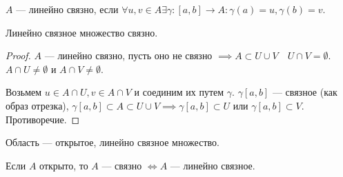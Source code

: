 \begin{definition}
    $A$ --- линейно связно, если  $\forall u, v \in A \exists \gamma\!: [a, b] \to A\!: \gamma(a) = u, \gamma(b) = v$.
\end{definition}
\begin{theorem}
    Линейно связное множество связно.
\end{theorem}
\begin{proof}
    $A$ --- линейно связно, пусть оно не связно $\implies A \subset U \cup V\quad U \cap V = \emptyset$.  $A \cap U \neq \emptyset$ и  $A \cap V \neq \emptyset$. 

    Возьмем  $u \in A \cap U, v \in A \cap V$ и соединим их путем  $\gamma$.  $\gamma[a,b]$ --- связное (как образ отрезка),  $\gamma[a, b] \subset A \subset U \cup V \implies \gamma[a, b] \subset U$ или $\gamma[a, b] \subset V$. Противоречие. 
\end{proof}
\begin{definition}
    Область --- открытое, линейно связное множество.
\end{definition}
\begin{remark}
    Если $A$ открыто, то  $A$ --- связно  $\iff A$ --- линейно связное.
\end{remark}
